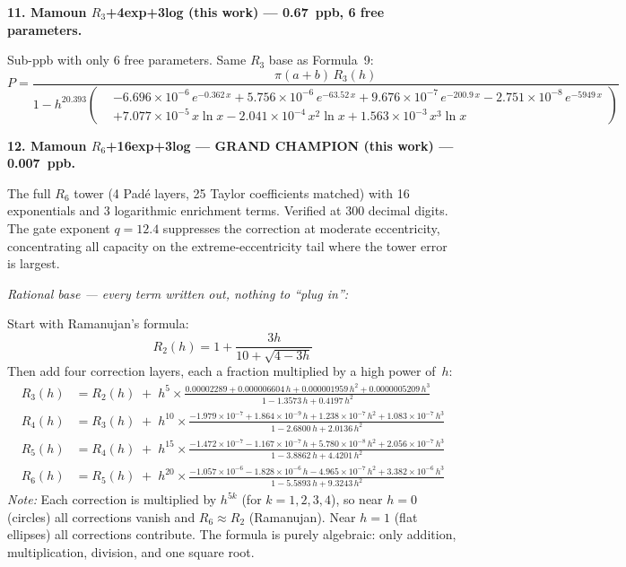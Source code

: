 \documentclass[12pt]{article}
\begin{document}
\bigskip

\noindent\textbf{11. Mamoun $R_3$+4exp+3log (this work) --- 0.67~ppb, 6 free parameters.}

\smallskip\noindent Sub-ppb with only 6 free parameters.  Same $R_3$ base as Formula~9:
\begin{equation*}
\boxed{P = \frac{\pi(a{+}b)\,R_3(h)}{1 - h^{20.393}\!\left(\!\begin{aligned}
  &-6.696{\times}10^{-6}\,e^{-0.362\,x}
  +5.756{\times}10^{-6}\,e^{-63.52\,x}
  +9.676{\times}10^{-7}\,e^{-200.9\,x}
  -2.751{\times}10^{-8}\,e^{-5949\,x} \\[2pt]
  &+7.077{\times}10^{-5}\,x\ln x
  -2.041{\times}10^{-4}\,x^2\ln x
  +1.563{\times}10^{-3}\,x^3\ln x
\end{aligned}\!\right)}}
\end{equation*}

\bigskip

\noindent\textbf{12. Mamoun $R_6$+16exp+3log --- GRAND CHAMPION (this work) --- 0.007~ppb.}

\smallskip\noindent The full $R_6$ tower (4 Pad\'e layers, 25 Taylor coefficients matched) with 16 exponentials and 3 logarithmic enrichment terms.  Verified at 300 decimal digits.  The gate exponent $q = 12.4$ suppresses the correction at moderate eccentricity, concentrating all capacity on the extreme-eccentricity tail where the tower error is largest.

\smallskip\noindent\emph{Rational base --- every term written out, nothing to ``plug in'':}

Start with Ramanujan's formula:
\[
R_2(h) = 1 + \frac{3h}{10 + \sqrt{4 - 3h}}
\]
Then add four correction layers, each a fraction multiplied by a high power of~$h$:
\begin{align*}
R_3(h) &= R_2(h) \;+\; h^5 \times
  \frac{0.00002289 + 0.000006604\,h + 0.000001959\,h^2 + 0.0000005209\,h^3}
       {1 - 1.3573\,h + 0.4197\,h^2}
\\[8pt]
R_4(h) &= R_3(h) \;+\; h^{10} \times
  \frac{-1.979{\times}10^{-7} + 1.864{\times}10^{-9}\,h + 1.238{\times}10^{-7}\,h^2 + 1.083{\times}10^{-7}\,h^3}
       {1 - 2.6800\,h + 2.0136\,h^2}
\\[8pt]
R_5(h) &= R_4(h) \;+\; h^{15} \times
  \frac{-1.472{\times}10^{-7} - 1.167{\times}10^{-7}\,h + 5.780{\times}10^{-8}\,h^2 + 2.056{\times}10^{-7}\,h^3}
       {1 - 3.8862\,h + 4.4201\,h^2}
\\[8pt]
R_6(h) &= R_5(h) \;+\; h^{20} \times
  \frac{-1.057{\times}10^{-6} - 1.828{\times}10^{-6}\,h - 4.965{\times}10^{-7}\,h^2 + 3.382{\times}10^{-6}\,h^3}
       {1 - 5.5893\,h + 9.3243\,h^2}
\end{align*}
\emph{Note:} Each correction is multiplied by $h^{5k}$ (for $k = 1, 2, 3, 4$), so near $h = 0$ (circles) all corrections vanish and $R_6 \approx R_2$ (Ramanujan).  Near $h = 1$ (flat ellipses) all corrections contribute.  The formula is purely algebraic: only addition, multiplication, division, and one square root.
\end{document}
